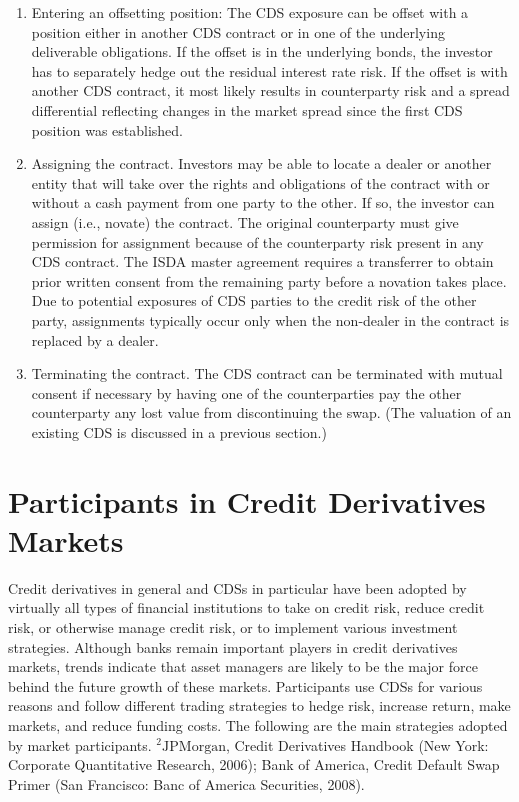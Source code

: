 \documentclass[11pt]{article}
\begin{document}
\begin{enumerate}
  \item Entering an offsetting position: The CDS exposure can be offset with a position either in another CDS contract or in one of the underlying deliverable obligations. If the offset is in the underlying bonds, the investor has to separately hedge out the residual interest rate risk. If the offset is with another CDS contract, it most likely results in counterparty risk and a spread differential reflecting changes in the market spread since the first CDS position was established.

  \item Assigning the contract. Investors may be able to locate a dealer or another entity that will take over the rights and obligations of the contract with or without a cash payment from one party to the other. If so, the investor can assign (i.e., novate) the contract. The original counterparty must give permission for assignment because of the counterparty risk present in any CDS contract. The ISDA master agreement requires a transferrer to obtain prior written consent from the remaining party before a novation takes place. Due to potential exposures of CDS parties to the credit risk of the other party, assignments typically occur only when the non-dealer in the contract is replaced by a dealer.

  \item Terminating the contract. The CDS contract can be terminated with mutual consent if necessary by having one of the counterparties pay the other counterparty any lost value from discontinuing the swap. (The valuation of an existing CDS is discussed in a previous section.)

\end{enumerate}

\section*{Participants in Credit Derivatives Markets}
Credit derivatives in general and CDSs in particular have been adopted by virtually all types of financial institutions to take on credit risk, reduce credit risk, or otherwise manage credit risk, or to implement various investment strategies. Although banks remain important players in credit derivatives markets, trends indicate that asset managers are likely to be the major force behind the future growth of these markets. Participants use CDSs for various reasons and follow different trading strategies to hedge risk, increase return, make markets, and reduce funding costs. The following are the main strategies adopted by market participants. ${ }^{2} \mathrm{JPMorgan}$, Credit Derivatives Handbook (New York: Corporate Quantitative Research, 2006); Bank of America, Credit Default Swap Primer (San Francisco: Banc of America Securities, 2008).
\end{document}
